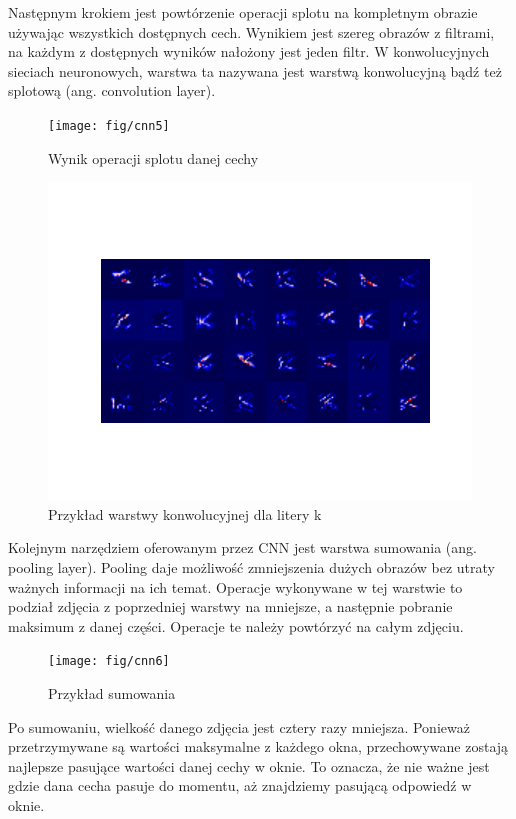 \documentclass[brudnopis]{xmgr}
\begin{document}
Następnym krokiem jest powtórzenie operacji splotu na kompletnym obrazie używając wszystkich dostępnych cech. Wynikiem jest szereg obrazów z filtrami, na każdym z dostępnych wyników nałożony jest jeden filtr. W konwolucyjnych sieciach neuronowych, warstwa ta nazywana jest warstwą konwolucyjną bądź też splotową (ang. convolution layer).

\begin{figure}[!tbh]
\centering
\texttt{[image: fig/cnn5]}
\caption{Wynik operacji splotu danej cechy}
\end{figure}

\begin{figure}[!tbh]
\centering
\includegraphics[width=.8\hsize]{fig/figure_1}
\caption{Przykład warstwy konwolucyjnej dla litery k}
\end{figure}
\newpage

Kolejnym narzędziem oferowanym przez CNN jest warstwa sumowania (ang. pooling layer). Pooling daje możliwość zmniejszenia dużych obrazów bez utraty ważnych informacji na ich temat. Operacje wykonywane w tej warstwie to podział zdjęcia z poprzedniej warstwy na mniejsze, a następnie pobranie maksimum z danej części. Operacje te należy powtórzyć na całym zdjęciu.


\begin{figure}[!tbh]
\centering
\texttt{[image: fig/cnn6]}
\caption{Przykład sumowania}
\end{figure}

Po sumowaniu, wielkość danego zdjęcia jest cztery razy mniejsza. Ponieważ przetrzymywane są wartości maksymalne z każdego okna, przechowywane zostają najlepsze pasujące wartości danej cechy w oknie. To oznacza, że nie ważne jest gdzie dana cecha pasuje do momentu, aż znajdziemy pasującą odpowiedź w oknie.
\end{document}
